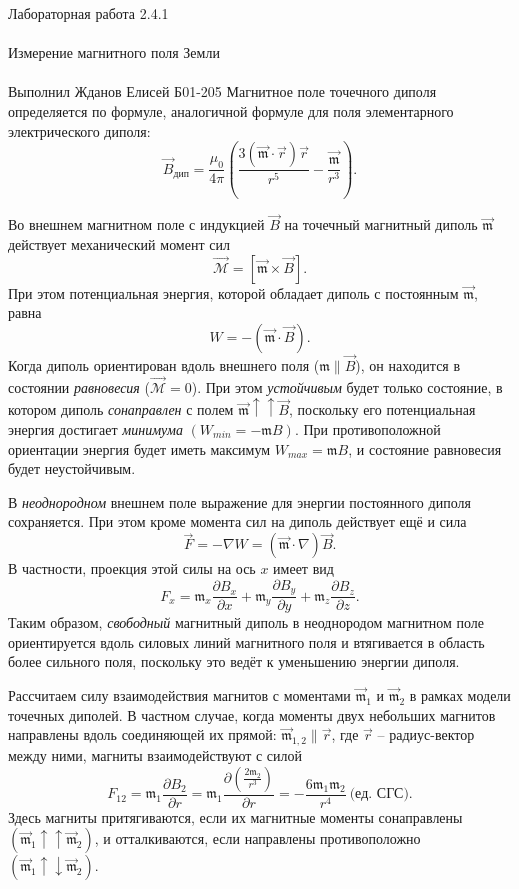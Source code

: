 \documentclass{astroedu-lab}
\begin{document}
\begin{problem}{\huge Лабораторная работа 2.4.1\\\\Измерение магнитного поля Земли\\\\Выполнил Жданов Елисей Б01-205}
Магнитное поле точечного диполя определяется по формуле, аналогичной формуле для поля элементарного электрического диполя:\[\vec{B}_{\text{дип}}=\frac{\mu_0}{4\pi}\left(\frac{3\left(\vec{\mathfrak{m}}\cdot\vec{r}\right)\vec{r}}{r^5}-\frac{\vec{\mathfrak{m}}}{r^3}\right).\]

Во внешнем магнитном поле с индукцией $\vec{B}$ на точечный магнитный диполь $\vec{\mathfrak{m}}$ действует механический момент сил\[\vec{\mathcal{M}}=\left[\vec{\mathfrak{m}}\times\vec{B}\right].\]При этом потенциальная энергия, которой обладает диполь с постоянным $\vec{\mathfrak{m}}$, равна\[W=-\left(\vec{\mathfrak{m}}\cdot\vec{B}\right).\]Когда диполь ориентирован вдоль внешнего поля ($\mathfrak{m}\parallel\vec{B}$), он находится в состоянии \textit{равновесия} ($\vec{\mathcal{M}}=0$). При этом \textit{устойчивым} будет только состояние, в котором диполь \textit{сонаправлен} с полем $\vec{\mathfrak{m}}\uparrow\uparrow\vec{B}$, поскольку его потенциальная энергия достигает \textit{минимума} $(W_{min}=-\mathfrak{m}B)$. При противоположной ориентации энергия будет иметь максимум $W_{max}=\mathfrak{m}B$, и состояние равновесия будет неустойчивым.

В \textit{неоднородном} внешнем поле выражение для энергии постоянного диполя сохраняется. При этом кроме момента сил на диполь действует ещё и сила\[\vec{F}=-\nabla W=\left(\vec{\mathfrak{m}}\cdot\nabla\right)\vec{B}.\]В частности, проекция этой силы на ось $x$ имеет вид\[F_x=\mathfrak{m}_x\frac{\partial B_x}{\partial x}+\mathfrak{m}_y\frac{\partial B_y}{\partial y}+\mathfrak{m}_z\frac{\partial B_z}{\partial z}.\]Таким образом, \textit{свободный} магнитный диполь в неоднородом магнитном поле ориентируется вдоль силовых линий магнитного поля и втягивается в область более сильного поля, поскольку это ведёт к уменьшению энергии диполя.

Рассчитаем силу взаимодействия магнитов с моментами $\vec{\mathfrak{m}}_1$ и $\vec{\mathfrak{m}}_2$ в рамках модели точечных диполей. В частном случае, когда моменты двух небольших магнитов направлены вдоль соединяющей их прямой: $\vec{\mathfrak{m}}_{1,2}\parallel\vec{r}$, где $\vec{r}$ -- радиус-вектор между ними, магниты взаимодействуют с силой\[F_{12}=\mathfrak{m}_1\frac{\partial B_2}{\partial r}=\mathfrak{m}_1\frac{\partial\left(\frac{2\mathfrak{m}_2}{r^3}\right)}{\partial r}=-\frac{6\mathfrak{m}_1\mathfrak{m}_2}{r^4}\ \text{(ед. СГС).}\]Здесь магниты притягиваются, если их магнитные моменты сонаправлены $(\vec{\mathfrak{m}}_1\uparrow\uparrow\vec{\mathfrak{m}}_2)$, и отталкиваются, если направлены противоположно $(\vec{\mathfrak{m}}_1\uparrow\downarrow\vec{\mathfrak{m}}_2)$.


\end{problem}
\end{document}
